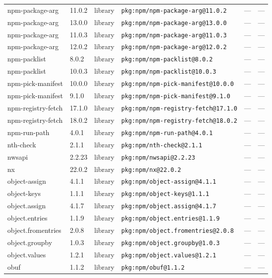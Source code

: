 \documentclass[11pt]{article}
\begin{document}
\begin{longtable}{|l|l|l|p{2.2cm}|l|p{4cm}|}
npm-package-arg & 11.0.2 & library & \texttt{pkg:npm/npm-package-arg@11.0.2} & — & — \\
npm-package-arg & 13.0.0 & library & \texttt{pkg:npm/npm-package-arg@13.0.0} & — & — \\
npm-package-arg & 11.0.3 & library & \texttt{pkg:npm/npm-package-arg@11.0.3} & — & — \\
npm-package-arg & 12.0.2 & library & \texttt{pkg:npm/npm-package-arg@12.0.2} & — & — \\
npm-packlist & 8.0.2 & library & \texttt{pkg:npm/npm-packlist@8.0.2} & — & — \\
npm-packlist & 10.0.3 & library & \texttt{pkg:npm/npm-packlist@10.0.3} & — & — \\
npm-pick-manifest & 10.0.0 & library & \texttt{pkg:npm/npm-pick-manifest@10.0.0} & — & — \\
npm-pick-manifest & 9.1.0 & library & \texttt{pkg:npm/npm-pick-manifest@9.1.0} & — & — \\
npm-registry-fetch & 17.1.0 & library & \texttt{pkg:npm/npm-registry-fetch@17.1.0} & — & — \\
npm-registry-fetch & 18.0.2 & library & \texttt{pkg:npm/npm-registry-fetch@18.0.2} & — & — \\
npm-run-path & 4.0.1 & library & \texttt{pkg:npm/npm-run-path@4.0.1} & — & — \\
nth-check & 2.1.1 & library & \texttt{pkg:npm/nth-check@2.1.1} & — & — \\
nwsapi & 2.2.23 & library & \texttt{pkg:npm/nwsapi@2.2.23} & — & — \\
nx & 22.0.2 & library & \texttt{pkg:npm/nx@22.0.2} & — & — \\
object-assign & 4.1.1 & library & \texttt{pkg:npm/object-assign@4.1.1} & — & — \\
object-keys & 1.1.1 & library & \texttt{pkg:npm/object-keys@1.1.1} & — & — \\
object.assign & 4.1.7 & library & \texttt{pkg:npm/object.assign@4.1.7} & — & — \\
object.entries & 1.1.9 & library & \texttt{pkg:npm/object.entries@1.1.9} & — & — \\
object.fromentries & 2.0.8 & library & \texttt{pkg:npm/object.fromentries@2.0.8} & — & — \\
object.groupby & 1.0.3 & library & \texttt{pkg:npm/object.groupby@1.0.3} & — & — \\
object.values & 1.2.1 & library & \texttt{pkg:npm/object.values@1.2.1} & — & — \\
obuf & 1.1.2 & library & \texttt{pkg:npm/obuf@1.1.2} & — & — \\

\end{longtable}
\end{document}
